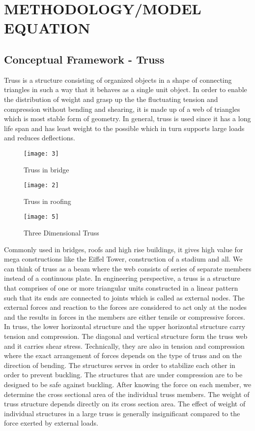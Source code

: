 
\chapter{METHODOLOGY/MODEL EQUATION}


\section{{\bf{Conceptual Framework - Truss}}}
    Truss is a structure consisting of organized objects in a shape of connecting triangles in such a way that it behaves as a single unit object. In order to enable the distribution of weight and grasp up the the fluctuating tension and compression without bending and shearing, it is made up of a web of triangles which is most stable form of geometry. In general, truss is used since it has a long life span and has least weight to the possible which in turn supports large loads and reduces deflections.\\
    
    \begin{figure}
    	\centering
    	\texttt{[image: 3]}
    	\caption{Truss in bridge}
    \end{figure}
%  
    \begin{figure}
    	\centering
    	\texttt{[image: 2]}
    	\caption{Truss in roofing}
    \end{figure}    
    \begin{figure}
    	\centering
    	\texttt{[image: 5]}
    	\caption{Three Dimensional Truss}
    \end{figure}
    

Commonly used in bridges, roofs and high rise buildings, it gives high value for mega constructions like the Eiffel Tower, construction of a stadium and all. We can think of truss as a beam where the web consists of series of separate members instead of a continuous plate. In engineering perspective, a truss is a structure that comprises of one or more triangular units constructed in a linear pattern such that its ends are connected to joints which is called as external nodes. The external forces and reaction to the forces are considered to act only at the nodes and the results in forces in the members are either tensile or compressive forces. In truss, the lower horizontal structure and the upper horizontal structure carry tension and compression. The diagonal and vertical structure form the truss web and it carries shear stress. Technically, they are also in tension and compression where the exact arrangement of forces depends on the type of truss and on the direction of bending. The structures serves in order to stabilize each other in order to prevent buckling. The structures that are under compression are to be designed to be safe against buckling. After knowing the force on each member, we determine the cross sectional area of the individual truss members. The weight of truss structure depends directly on its cross section area. The effect of weight of individual structures in a large truss is generally insignificant compared to the force exerted by external loads.\\

